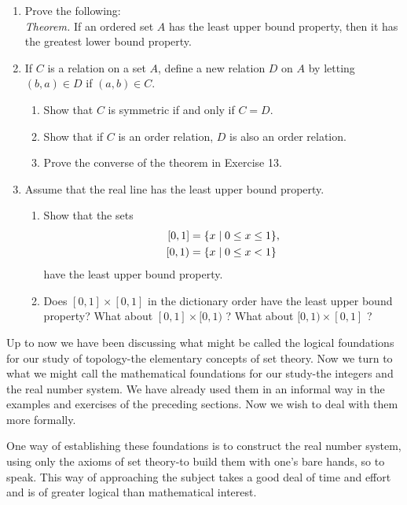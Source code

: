 \begin{enumerate}[itemsep=0.4em, parsep=0pt, topsep=0pt, partopsep=0pt, leftmargin=*, label=\arabic*., ref=\arabic*, resume]
\item Prove the following: \\ \textsl{Theorem.} If an ordered set \(A\) has the least upper bound property, then it has the greatest lower bound property.
\item If \(C\) is a relation on a set \(A\), define a new relation \(D\) on \(A\) by letting \(({b,a}) \in D\) if \(({a,b}) \in C\).
  \begin{enumerate}[itemsep=0.2em, parsep=0pt, topsep=0pt, partopsep=0pt, leftmargin=*, label=(\alph*), align=left]
  \item Show that \(C\) is symmetric if and only if \(C = D\).
  \item Show that if \(C\) is an order relation, \(D\) is also an order relation.
  \item Prove the converse of the theorem in Exercise 13.
  \end{enumerate}
\item Assume that the real line has the least upper bound property.
  \begin{enumerate}[itemsep=0.2em, parsep=0pt, topsep=0pt, partopsep=0pt, leftmargin=*, label=(\alph*), align=left]
  \item Show that the sets \[ \begin{aligned}\relax [{0,1}] &= \{ x \mid 0 \leq x \leq 1\}, \\ \lbrack 0,1) &= \{ x \mid 0 \leq x < 1\} \end{aligned} \] have the least upper bound property.
  \item Does \([{0,1}] \times [{0,1}]\) in the dictionary order have the least upper bound property? What about \([{0,1}] \times \lbrack 0,1)\) ? What about \(\lbrack 0,1) \times [{0,1}]\) ?
  \end{enumerate}
\end{enumerate}


Up to now we have been discussing what might be called the logical foundations 
for our study of topology-the elementary concepts of set theory. 
Now we turn to what we might call the mathematical foundations for 
our study-the integers and the real number system. We have already used them 
in an informal way in the examples and exercises of the preceding sections. 
Now we wish to deal with them more formally.

One way of establishing these foundations is to construct the real number 
system, using only the axioms of set theory-to build them with one's bare 
hands, so to speak. This way of approaching the subject takes a good deal 
of time and effort and is of greater logical than mathematical interest.

